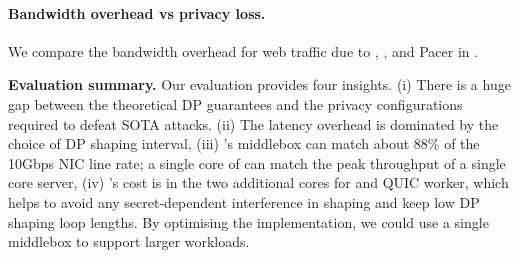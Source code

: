 \paragraph{Bandwidth overhead vs privacy loss.}
We compare the bandwidth overhead for web traffic due to {\ns}, {\constshape},
and Pacer in .

 

\fi

\smallskip\noindent
\textbf{Evaluation summary.}
{
Our evaluation provides four insights.
(i) There is a huge gap between the theoretical DP guarantees and the
privacy configurations required to defeat SOTA attacks.
(ii) The latency overhead is dominated by the choice of DP shaping interval,
(iii) {\sys}'s middlebox can match about 88\% of the 10Gbps NIC line rate; a
single core of
{\ushaper} can match the peak throughput of a single core server,
(iv) {\sys}'s cost is in the two additional cores for {\prepare} and QUIC worker,
which helps to avoid any secret-dependent interference in shaping and keep low DP
shaping loop lengths. By optimising the implementation, we could use a
single middlebox to support larger workloads.
}
